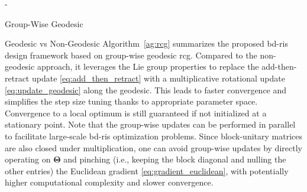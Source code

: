 \begin{section}{-}
\begin{subsection}{Group-Wise Geodesic }
\begin{subsubsection}{Geodesic vs Non-Geodesic }
			Algorithm~\ref{ag:rcg} summarizes the proposed \gls{bd}-\gls{ris} design framework based on group-wise geodesic \gls{rcg}.
			Compared to the non-geodesic approach, it leverages the Lie group properties to replace the add-then-retract update \eqref{eq:add_then_retract} with a multiplicative rotational update \eqref{eq:update_geodesic} along the geodesic.
			This leads to faster convergence and simplifies the step size tuning thanks to appropriate parameter space.
			Convergence to a local optimum is still guaranteed if not initialized at a stationary point.
			Note that the group-wise updates can be performed in parallel to facilitate large-scale \gls{bd}-\gls{ris} optimization problems.
			Since block-unitary matrices are also closed under multiplication, one can avoid group-wise updates by directly operating on $\mathbf{\Theta}$ and pinching (i.e., keeping the block diagonal and nulling the other entries) the Euclidean gradient \eqref{eq:gradient_euclidean}, with potentially higher computational complexity and slower convergence.
		\end{subsubsection}
	\end{subsection}



\end{section}
